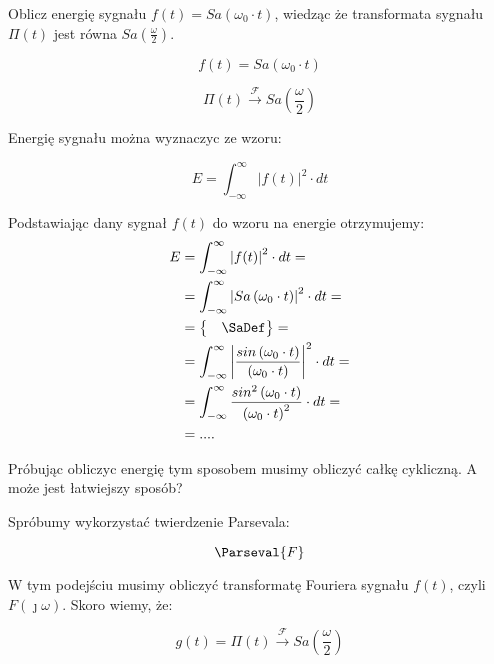 \begin{task}
Oblicz energię sygnału $f(t)=Sa\left(\omega_0 \cdot t\right)$, wiedząc że transformata sygnału $\Pi(t)$ jest równa $Sa\left(\frac{\omega}{2}\right)$.

\begin{equation}
f(t) = Sa\left(\omega_0 \cdot t\right)
\end{equation}

\begin{equation}
\Pi(t) \xrightarrow{\mathcal F} Sa\left(\frac{\omega}{2}\right)
\end{equation}

Energię sygnału można wyznaczyc ze wzoru:

\begin{equation}
E= \int_{-\infty }^{\infty}\left|f(t)\right| ^2 \cdot dt
\end{equation}

Podstawiając dany sygnał $f(t)$ do wzoru na energie otrzymujemy:
\begin{align*}
E &= \int_{-\infty }^{\infty}\left|f(t)\right| ^2 \cdot dt=\\
&= \int_{-\infty }^{\infty}\left|Sa\left(\omega_0 \cdot t\right)\right| ^2 \cdot dt=\\
&=\begin{Bmatrix}
&\SaDef
\end{Bmatrix}=\\
&= \int_{-\infty }^{\infty}\left|\frac{sin\left(\omega_0 \cdot t\right)}{\left(\omega_0 \cdot t\right)}\right| ^2 \cdot dt=\\
&= \int_{-\infty }^{\infty}\frac{sin^2\left(\omega_0 \cdot t\right)}{\left(\omega_0 \cdot t\right)^2} \cdot dt=\\
&=....
\end{align*}

Próbując obliczyc energię tym sposobem musimy obliczyć całkę cykliczną. A może jest łatwiejszy sposób?

Spróbumy wykorzystać twierdzenie Parsevala:

\begin{equation}
\Parseval{F}
\end{equation}

W tym podejściu musimy obliczyć transformatę Fouriera sygnału $f(t)$, czyli $F(\jmath \omega)$.
Skoro wiemy, że:

\begin{equation}
g(t) = \Pi(t) \xrightarrow{\mathcal F} Sa\left(\frac{\omega}{2}\right)
\end{equation}


\end{task}
